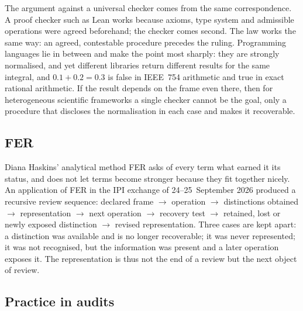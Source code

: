 The argument against a universal checker comes from the same correspondence. A proof
checker such as Lean works because axioms, type system and admissible operations were
agreed beforehand; the checker comes second. The law works the same way: an agreed,
contestable procedure precedes the ruling. Programming languages lie in between and make
the point most sharply: they are strongly normalised, and yet different libraries return
different results for the same integral, and $0.1+0.2=0.3$ is false in IEEE~754
arithmetic and true in exact rational arithmetic. If the result depends on the frame even
there, then for heterogeneous scientific frameworks a single checker cannot be the goal,
only a procedure that discloses the normalisation in each case and makes it recoverable.

\subsection{FER}

Diana Haskins' analytical method FER asks of every term what earned it its status, and
does not let terms become stronger because they fit together nicely. An application of
FER in the IPI exchange of 24--25~September 2026 produced a recursive review sequence:
declared frame $\to$ operation $\to$ distinctions obtained $\to$ representation $\to$ next
operation $\to$ recovery test $\to$ retained, lost or newly exposed distinction $\to$
revised representation. Three cases are kept apart: a distinction was available and is no
longer recoverable; it was never represented; it was not recognised, but the information
was present and a later operation exposes it. The representation is thus not the end of a
review but the next object of review.

\subsection{Practice in audits}

